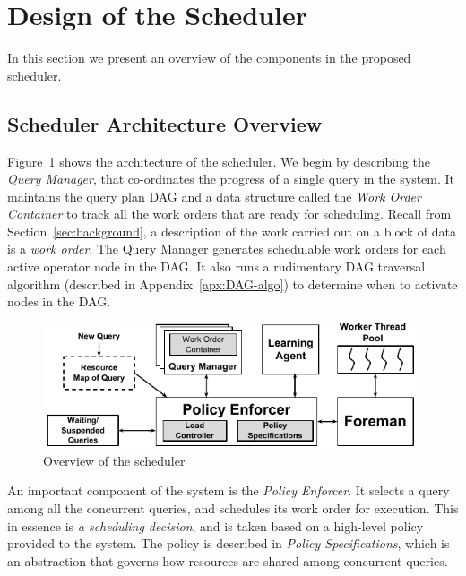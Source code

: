 \section{Design of the Scheduler}\label{sec:design}
In this section we present an overview of the components in the proposed \sys{} scheduler.

\subsection{Scheduler Architecture Overview}\label{ssec:scheduler-arch}
Figure~\ref{fig:scheduler-architecture} shows the architecture of the \sys{} scheduler.
We begin by describing the \textit{Query Manager}, that co-ordinates the progress of a single query in the system.
It maintains the query plan DAG and a data structure called
the \textit{Work Order Container} to track all the work orders that are ready for
scheduling. 
Recall from Section~\ref{sec:background}, a description of the work carried out on a block of data is a \textit{work order}. 
The Query Manager generates schedulable work orders for each active operator node in the DAG. 
It also runs a rudimentary DAG traversal algorithm (described in Appendix~\ref{apx:DAG-algo}) to determine when to activate nodes in the DAG. 

\begin{figure}
	\centering
	\includegraphics[width=\columnwidth]{figures/Scheduler-Architecture.pdf}
	\vspace*{-1.5em}
	\caption{Overview of the scheduler}
	\label{fig:scheduler-architecture}
	\vspace*{-1.5em}
\end{figure}

An important component of the system is the \textit{Policy Enforcer}.
It selects a query among all the concurrent queries, and schedules its work order for execution. 
This in essence is \textit{a scheduling decision}, and is taken based on a high-level policy provided to the system.
The policy is described in \textit{Policy Specifications}, which is an
abstraction that governs how resources are shared among concurrent queries. 

